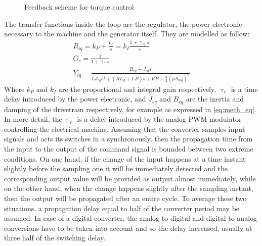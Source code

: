 \begin{figure}[htb]
    \centering
    
    \caption{Feedback scheme for torque control}
    \label{fig:d_torque_control}
\end{figure}

The transfer functions inside the loop are the regulator, the power electronic necessary to the machine and the generator itself. They are modelled as follow:
\begin{gather}
    R_{iq}=k_P + \frac{k_I}{s}=k_I\frac{1+\uptau_{iq}s}{s}
    \label{eq:R_iq}\\
    G_c = \frac{1}{1+\uptau_cs}
    \label{eq:G_c}\\
    Y_{iq} = \frac{B_{eq} + J_{eq}s}{LJ_{eq}s^2+\left(RI_{eq} + L B\right)s + RB + \frac{3}{2}(p\Lambda_{mg})^2}
    \label{eq:Y_iq}
\end{gather}
Where $k_P$ and $k_I$ are the proportional and integral gain respectively, $\uptau_c$ is a time delay introduced by the power electronic, and $J_{eq}$ and $B_{eq}$ are the inertia and damping of the drivetrain respectively, for example as expressed in \autoref{eq:mech_eq}.\\
In more detail, the $\uptau_c$ is a delay introduced by the analog PWM modulator controlling the electrical machine. Assuming that the converter samples input signals and acts its switches in a synchronously, then the propagation time from the input to the output of the command signal is bounded between two extreme conditions. On one hand, if the change of the input happens at a time instant slightly before the sampling one it will be immediately detected and the corresponding output value will be provided as output almost immediately, while on the other hand, when the change happens slightly after the sampling instant, then the output will be propagated after an entire cycle. To average these two situations, a propagation delay equal to half of the converter period may be assumed. In case of a digital converter, the analog to digital and digital to analog conversions have to be taken into account and so the delay increased, usually at three half of the switching delay.
